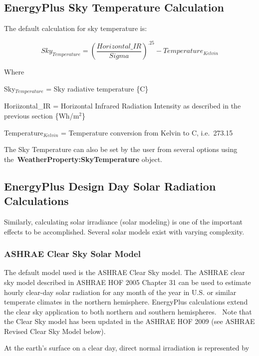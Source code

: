 \subsection{EnergyPlus Sky Temperature Calculation}\label{energyplus-sky-temperature-calculation}

The default calculation for sky temperature is:

\begin{equation}
Sk{y_{Temperature}} = {\left( {\frac{{Horizontal\_IR}}{{Sigma}}} \right)^{.25}} - Temperatur{e_{Kelvin}}
\end{equation}

Where

Sky\(_{Temperature}\) = Sky radiative temperature \{C\}

Horiizontal\_IR = Horizontal Infrared Radiation Intensity as described in the previous section \{Wh/m\(^{2}\)\}

Temperature\(_{Kelvin}\) = Temperature conversion from Kelvin to C, i.e.~273.15

The Sky Temperature can also be set by the user from several options using the~\textbf{WeatherProperty:SkyTemperature} object.

\subsection{EnergyPlus Design Day Solar Radiation Calculations}\label{energyplus-design-day-solar-radiation-calculations}

Similarly, calculating solar irradiance (solar modeling) is one of the important effects to be accomplished. Several solar models exist with varying complexity.

\subsubsection{ASHRAE Clear Sky Solar Model}\label{ashrae-clear-sky-solar-model}

The default model used is the ASHRAE Clear Sky model. The ASHRAE clear sky model described in ASHRAE HOF 2005 Chapter 31 can be used to estimate hourly clear-day solar radiation for any month of the year in U.S. or similar temperate climates in the northern hemisphere. EnergyPlus calculations extend the clear sky application to both northern and southern hemispheres.~ Note that the Clear Sky model has been updated in the ASHRAE HOF 2009 (see ASHRAE Revised Clear Sky Model below).

At the earth's surface on a clear day, direct normal irradiation is represented by

